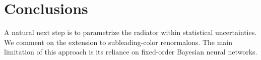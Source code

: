 \section{Conclusions}\label{sec:conclusions}

A natural next step is to parametrize the radiator within statistical
uncertainties. We comment on the extension to subleading-color
renormalons. The main limitation of this approach is its reliance on
fixed-order Bayesian neural networks.

